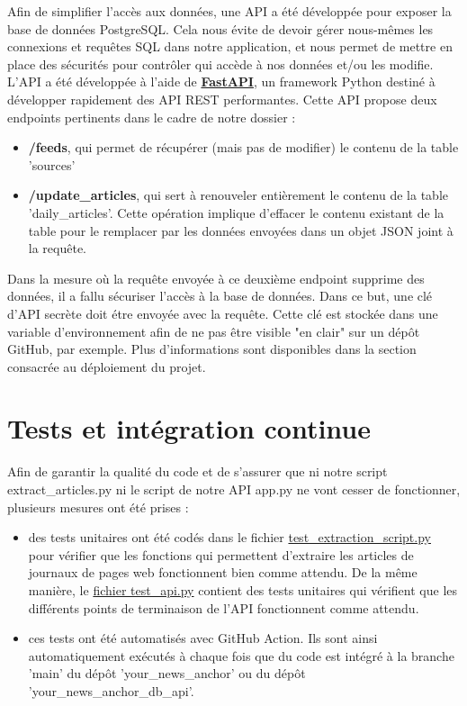 \documentclass[french]{article}
\begin{document}
    Afin de simplifier l'accès aux données, une API a été développée pour exposer la base de données PostgreSQL. Cela nous évite de devoir gérer nous-mêmes les connexions et requêtes SQL dans notre application, et nous permet de mettre en place des sécurités pour contrôler qui accède à nos données et/ou les modifie.
    L'API a été développée à l'aide de \textbf{\href{https://fastapi.tiangolo.com/}{FastAPI}}, un framework Python destiné à développer rapidement des API REST performantes. Cette API propose deux endpoints pertinents dans le cadre de notre dossier :
    \begin{itemize}
        \item \textbf{/feeds}, qui permet de récupérer (mais pas de modifier) le contenu de la table 'sources'
        \item \textbf{/update\_articles}, qui sert à renouveler entièrement le contenu de la table 'daily\_articles'. Cette opération implique d'effacer le contenu existant de la table pour le remplacer par les données envoyées dans un objet JSON joint à la requête.
    \end{itemize}

    Dans la mesure où la requête envoyée à ce deuxième endpoint supprime des données, il a fallu sécuriser l'accès à la base de données. Dans ce but, une clé d'API secrète doit étre envoyée avec la requête. Cette clé est stockée dans une variable d'environnement afin de ne pas être visible "en clair" sur un dépôt GitHub, par exemple. Plus d'informations sont disponibles dans la section consacrée au déploiement du projet.

    \section{Tests et intégration continue}
    Afin de garantir la qualité du code et de s'assurer que ni notre script extract\_articles.py ni le script de notre API app.py ne vont cesser de fonctionner, plusieurs mesures ont été prises :
    \begin{itemize}
        \item des tests unitaires ont été codés dans le fichier \href{https://github.com/vinpap/your_news_anchor/blob/main/test/test_extraction_script.py}{test\_extraction\_script.py} pour vérifier que les fonctions qui permettent d'extraire les articles de journaux de pages web fonctionnent bien comme attendu. De la même manière, le \href{https://github.com/vinpap/your_news_anchor_db_api/blob/main/test_api.py}{fichier test\_api.py} contient des tests unitaires qui vérifient que les différents points de terminaison de l'API fonctionnent comme attendu.
        \item ces tests ont été automatisés avec GitHub Action. Ils sont ainsi automatiquement exécutés à chaque fois que du code est intégré à la branche 'main' du dépôt 'your\_news\_anchor' ou du dépôt 'your\_news\_anchor\_db\_api'.
    \end{itemize}
\end{document}
